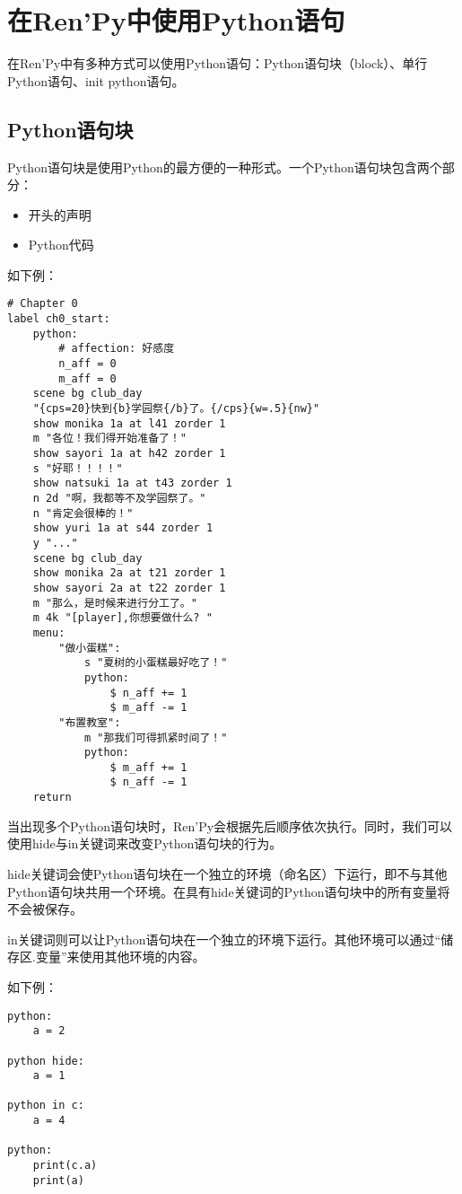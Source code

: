 \section{在Ren'Py中使用Python语句}
\label{sec:4.3}
在Ren'Py中有多种方式可以使用Python语句：Python语句块（block）、单行Python语句、init python语句。

\subsection{Python语句块}
Python语句块是使用Python的最方便的一种形式。一个Python语句块包含两个部分：
\begin{itemize}
    \item 开头的声明
    \item Python代码
\end{itemize}

如下例：

\begin{lstlisting}
# Chapter 0
label ch0_start:
    python:
        # affection: 好感度
        n_aff = 0
        m_aff = 0
    scene bg club_day
    "{cps=20}快到{b}学园祭{/b}了。{/cps}{w=.5}{nw}"
    show monika 1a at l41 zorder 1
    m "各位！我们得开始准备了！"
    show sayori 1a at h42 zorder 1
    s "好耶！！！！"
    show natsuki 1a at t43 zorder 1
    n 2d "啊，我都等不及学园祭了。"
    n "肯定会很棒的！"
    show yuri 1a at s44 zorder 1
    y "..."
    scene bg club_day
    show monika 2a at t21 zorder 1
    show sayori 2a at t22 zorder 1
    m "那么，是时候来进行分工了。"
    m 4k "[player],你想要做什么? "
    menu:
        "做小蛋糕":
            s "夏树的小蛋糕最好吃了！"
            python:
                $ n_aff += 1
                $ m_aff -= 1
        "布置教室":
            m "那我们可得抓紧时间了！"
            python:
                $ m_aff += 1
                $ n_aff -= 1
    return

\end{lstlisting}

当出现多个Python语句块时，Ren'Py会根据先后顺序依次执行。同时，我们可以使用hide与in关键词来改变Python语句块的行为。

hide关键词会使Python语句块在一个独立的环境（命名区）下运行，即不与其他Python语句块共用一个环境。在具有hide关键词的Python语句块中的所有变量将不会被保存。

in关键词则可以让Python语句块在一个独立的环境下运行。其他环境可以通过“储存区.变量”来使用其他环境的内容。

如下例：
\begin{lstlisting}
python:
    a = 2

python hide:
    a = 1

python in c:
    a = 4

python:
    print(c.a)
    print(a)
\end{lstlisting}

